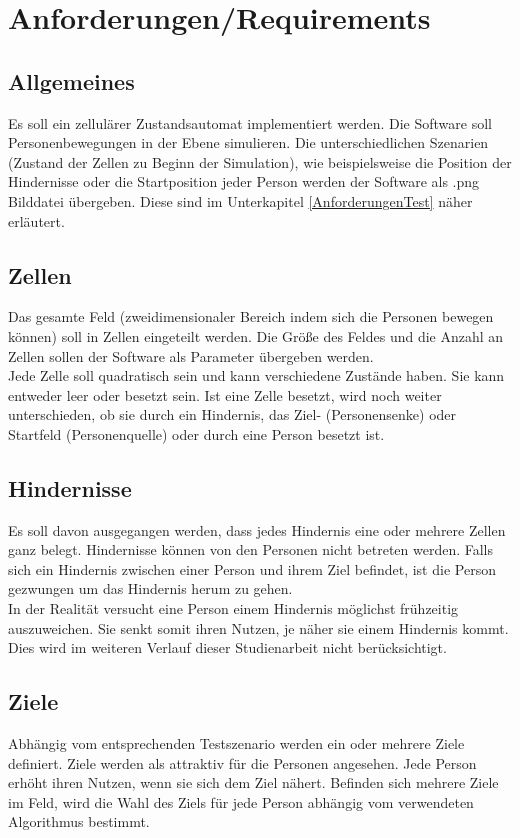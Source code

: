 \newpage
\section{Anforderungen/Requirements}
\label{requirements}

\subsection{Allgemeines}
Es soll ein zellulärer Zustandsautomat implementiert werden. Die Software soll Personenbewegungen in der Ebene simulieren. Die unterschiedlichen Szenarien (Zustand der Zellen zu Beginn der Simulation), wie beispielsweise die Position der Hindernisse oder die Startposition jeder Person werden der Software als .png Bilddatei übergeben. Diese sind im Unterkapitel \ref{AnforderungenTest} näher erläutert. 



\subsection{Zellen}
Das gesamte Feld (zweidimensionaler Bereich indem sich die Personen bewegen können) soll in Zellen eingeteilt werden. Die Größe des Feldes und die Anzahl an Zellen sollen der Software als Parameter übergeben werden.\\
Jede Zelle soll quadratisch sein und kann verschiedene Zustände haben. Sie kann entweder leer oder besetzt sein. Ist eine Zelle besetzt, wird noch weiter unterschieden, ob sie durch ein Hindernis, das Ziel- (Personensenke) oder Startfeld (Personenquelle) oder durch eine Person besetzt ist.

\subsection{Hindernisse}
Es soll davon ausgegangen werden, dass jedes Hindernis eine oder mehrere Zellen ganz belegt. Hindernisse können von den Personen nicht betreten werden. Falls sich ein Hindernis zwischen einer Person und ihrem Ziel befindet, ist die Person gezwungen um das Hindernis herum zu gehen. \\
In der Realität versucht eine Person einem Hindernis möglichst frühzeitig auszuweichen. Sie senkt somit ihren Nutzen, je näher sie einem Hindernis kommt. Dies wird im weiteren Verlauf dieser Studienarbeit nicht berücksichtigt.

\subsection{Ziele}
Abhängig vom entsprechenden Testszenario werden ein oder mehrere Ziele definiert. Ziele werden als attraktiv für die Personen angesehen. Jede Person erhöht ihren Nutzen, wenn sie sich dem Ziel nähert. Befinden sich mehrere Ziele im Feld, wird die Wahl des Ziels für jede Person abhängig vom verwendeten Algorithmus bestimmt. 

